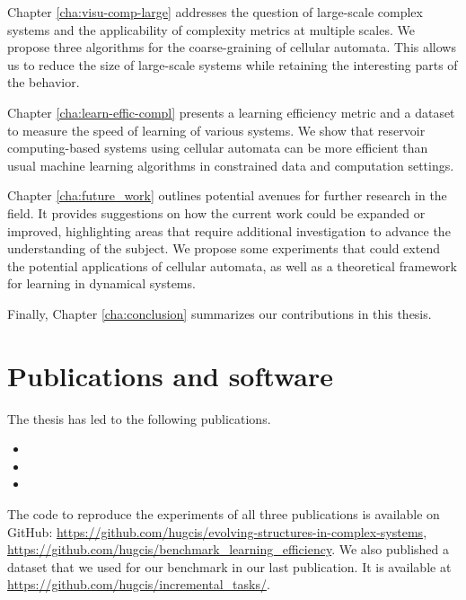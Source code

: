 Chapter \ref{cha:visu-comp-large} addresses the question of large-scale complex
systems and the applicability of complexity metrics at multiple scales. We
propose three algorithms for the coarse-graining of cellular automata. This allows
us to reduce the size of large-scale systems while retaining the interesting parts
of the behavior.

Chapter \ref{cha:learn-effic-compl} presents a learning efficiency metric and a
dataset to measure the speed of learning of various systems. We show that
reservoir computing-based systems using cellular automata can be more efficient
than usual machine learning algorithms in constrained data and computation
settings.

Chapter \ref{cha:future_work} outlines potential avenues for further research in 
the field. It provides suggestions on how the current work could be expanded or 
improved, highlighting areas that require additional investigation to advance the 
understanding of the subject. We propose some experiments that could extend the 
potential applications of cellular automata, as well as a theoretical framework 
for learning in dynamical systems.

Finally, Chapter \ref{cha:conclusion} summarizes our contributions in this thesis. 

\section{Publications and software}

The thesis has led to the following publications.

\begin{itemize}
  \item {}
  \item {}
  \item {}
\end{itemize}

The code to reproduce the experiments of all three publications is available on
GitHub: \url{https://github.com/hugcis/evolving-structures-in-complex-systems},
\url{https://github.com/hugcis/benchmark_learning_efficiency}. We also published a
dataset that we used for our benchmark in our last
publication. It is available at
\url{https://github.com/hugcis/incremental_tasks/}.

